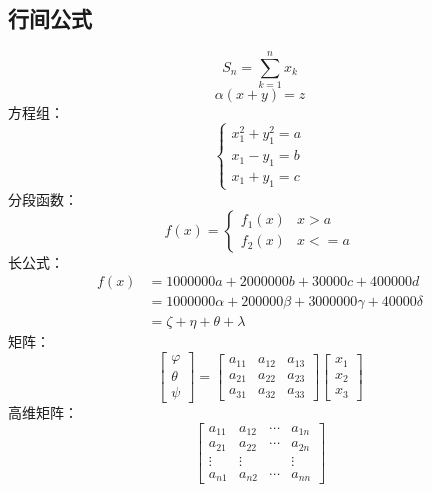 \documentclass[a4paper,AutoFakeBold]{ctexart} %
\begin{document}
\subsection{行间公式}
\begin{equation}
	S_{n}=\sum_{k=1}^{n} x_{k} \label{(1)}
\end{equation}
\begin{equation}
	\alpha\left( x+y\right) =z
\end{equation}
方程组：
\begin{equation}
	\begin{cases}
		x_{1}^{2}+y_{1}^2=a\\
		x_{1}-y_{1}=b\\
		x_{1}+y_{1}=c
	\end{cases}
\end{equation}
分段函数：
\begin{equation}
	f(x)=
	\begin{cases}
		f_{1}(x) &x>a\\
		f_{2}(x) &x<=a
	\end{cases}
\end{equation}
长公式：
\begin{equation}
	\begin{split}
		f(x)&=1000000a+2000000b+30000c+400000d\\
		&=1000000\alpha+200000\beta+3000000\gamma+40000\delta\\
		&=\zeta+\eta+\theta+\lambda
	\end{split}
\end{equation}
矩阵：
\begin{equation}
	\left[ 
	\begin{array}{c}
		\varphi\\
		\theta\\
		\psi
	\end{array}\right] =
	\left[
	\begin{array}{ccc}
		a_{11}&a_{12}&a_{13}\\
		a_{21}&a_{22}&a_{23}\\
		a_{31}&a_{32}&a_{33}
	\end{array}\right] 
	\left[\begin{array}{c}
		x_{1}\\
		x_{2}\\
		x_{3} 
	\end{array}\right] 
\end{equation}
高维矩阵：
\begin{equation}
	\left[ \begin{array}{cccc}
		a_{11}&a_{12}&\cdots&a_{1n}\\
		a_{21}&a_{22}&\cdots&a_{2n}\\
		\vdots&\vdots&{}&\vdots\\
		a_{n1}&a_{n2}&\cdots&a_{nn}
	\end{array}\right] 
\end{equation}
\end{document}
